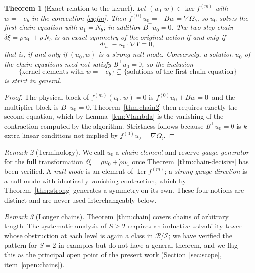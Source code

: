 \documentclass[12pt]{article}
\theoremstyle{plain}
\newtheorem{theorem}{Theorem}[section]
\theoremstyle{definition}
\theoremstyle{remark}
\newtheorem{remark}[theorem]{Remark}
\newcommand{\Om}{\Omega}
\newcommand{\Ical}{\mathcal{I}}
\newcommand{\Rring}{\mathcal{R}}
\begin{document}
	\begin{theorem}[Exact relation to the kernel]
		\label{thm:chainkernel}
		Let $(u_{0},w)\in\ker f^{(m)}$ with $w=-e_{b}$ in the convention \eqref{eq:fm}.
		Then $f^{(0)}u_{0}=-Bw=\nabla\Om_{b}$, so $u_{0}$ solves the first chain
		equation with $u_{1}=N_{b}$; in addition $B^{\top}u_{0}=0$. The two-step chain
		$\delta\xi=\rho\,u_{0}+\dot\rho\,N_{b}$ is an exact symmetry of the original
		action if and only if
		\begin{equation}
			\Phi_{u_{0}}=u_{0}\cdot\nabla V\equiv0,
			\label{eq:chainkernel}
		\end{equation}
		that is, if and only if $(u_{0},w)$ is a \emph{strong} null mode. Conversely, a
		solution $u_{0}$ of the chain equations need not satisfy $B^{\top}u_{0}=0$, so
		the inclusion
		\[
		\{\text{kernel elements with }w=-e_{b}\}
		\subsetneq
		\{\text{solutions of the first chain equation}\}
		\]
		is strict in general.
	\end{theorem}
	
	\begin{proof}
		The physical block of $f^{(m)}(u_{0},w)=0$ is $f^{(0)}u_{0}+Bw=0$, and the
		multiplier block is $B^{\top}u_{0}=0$. Theorem~\ref{thm:chain2} then requires
		exactly the second equation, which by Lemma~\ref{lem:Vlambda} is the vanishing
		of the contraction computed by the algorithm. Strictness follows because
		$B^{\top}u_{0}=0$ is $k$ extra linear conditions not implied by
		$f^{(0)}u_{0}=\nabla\Om_{b}$.
	\end{proof}
	
	\begin{remark}[Terminology]
		\label{rem:terminology}
		We call $u_{0}$ a \emph{chain element} and reserve \emph{gauge generator} for
		the full transformation $\delta\xi=\rho u_{0}+\dot\rho u_{1}$ once
		Theorem~\ref{thm:chain-decisive} has been verified. A \emph{null mode} is an
		element of $\ker f^{(m)}$; a \emph{strong gauge direction} is a null mode with
		identically vanishing contraction, which by Theorem~\ref{thm:strong} generates a
		symmetry on its own. These four notions are distinct and are never used
		interchangeably below.
	\end{remark}
	
	\begin{remark}[Longer chains]
		\label{rem:longer}
		Theorem~\ref{thm:chain} covers chains of arbitrary length. The systematic
		analysis of $S\geq2$ requires an inductive solvability tower whose obstruction
		at each level is again a class in $\Rring/\Ical$; we have verified the pattern
		for $S=2$ in examples but do not have a general theorem, and we flag this as the
		principal open point of the present work
		(Section~\ref{sec:scope}, item~\ref{open:chains}).
	\end{remark}
	
\end{document}
